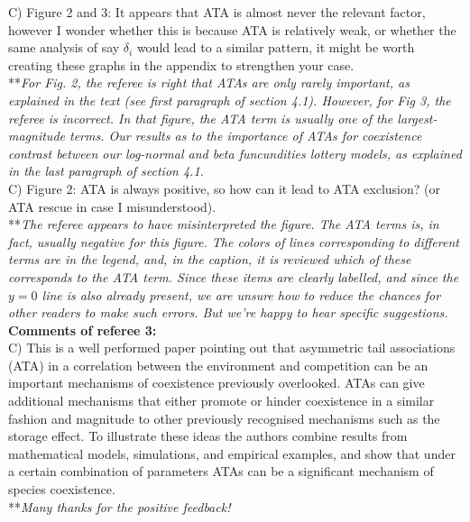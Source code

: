 \documentclass[letterpaper,11pt]{article}
\begin{document}
\noindent C) Figure 2 and 3: It appears that ATA is almost never the relevant factor, however I wonder whether this is because ATA is relatively weak, or whether the same analysis of say $\delta_i$ would lead to a similar pattern, it might be worth creating these graphs in the appendix to strengthen your case. \\

\noindent ***\emph{For Fig. 2, the referee is right that ATAs are only rarely important, as explained in the text 
(see first paragraph of section 4.1). However, for Fig 3, the referee is incorrect. In that figure, the ATA term
is usually one of the largest-magnitude terms. Our results as to the importance of ATAs for coexistence 
contrast between our log-normal and beta funcundities lottery models, as explained in the last paragraph
of section 4.1.} \\

\noindent C) Figure 2: ATA is always positive, so how can it lead to ATA exclusion? (or ATA rescue in case I misunderstood). \\

\noindent ***\emph{The referee appears to have misinterpreted the figure. The ATA terms is, in fact, usually
negative for this figure. The colors of lines corresponding to different terms are in the legend, and, in the caption,
it is reviewed which of these corresponds to the ATA term. Since these items are clearly labelled, and since 
the $y=0$ line is also already present, we are unsure how to reduce the chances for other readers to make
such errors. But we're happy to hear specific suggestions.} \\


\noindent \textbf{Comments of referee 3:} \\
  
\noindent C) This is a well performed paper pointing out that asymmetric tail associations (ATA) in a correlation between the environment and competition can be an important mechanisms of coexistence previously overlooked. ATAs can give additional mechanisms that either promote or hinder coexistence in a similar fashion and magnitude to other previously recognised mechanisms such as the storage effect. To illustrate these ideas the authors combine results from mathematical models, simulations, and empirical examples, and show that under a certain combination of parameters ATAs can be a significant mechanism of species coexistence. \\

\noindent ***\emph{Many thanks for the positive feedback!} \\
\end{document}
